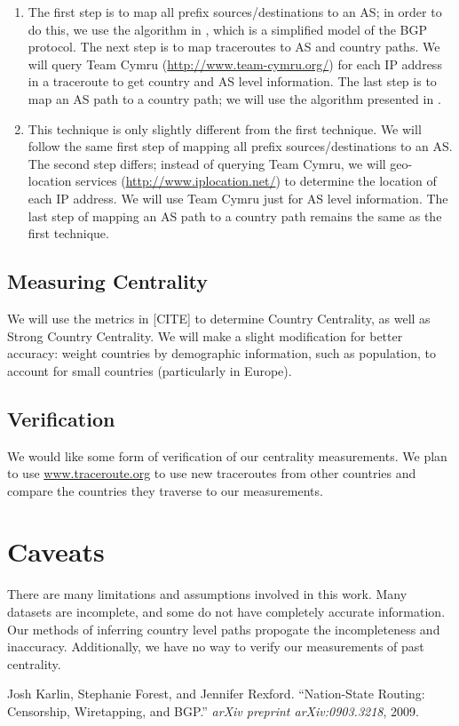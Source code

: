 \documentclass[12pt, letterpaper]{article}
\begin{document}
\begin{spacing}{.95}
\begin{enumerate} [noitemsep]

\item The first step is to map all prefix sources/destinations to an AS; in order to do this, we use the algorithm in \cite{nationstate}, which is a simplified model of the BGP protocol.  The next step is to map traceroutes to AS and country paths.  We will query Team Cymru (\url{http://www.team-cymru.org/}) for each IP address in a traceroute to get country and AS level information.  The last step is to map an AS path to a country path; we will use the algorithm presented in \cite{nationstate}.
\item This technique is only slightly different from the first technique.  We will follow the same first step of mapping all prefix sources/destinations to an AS.  The second step differs; instead of querying Team Cymru, we will geo-location services (\url{http://www.iplocation.net/}) to determine the location of each IP address.  We will use Team Cymru just for AS level information.  The last step of mapping an AS path to a country path remains the same as the first technique.

\end{enumerate}

\subsection{Measuring Centrality}

We will use the metrics in [CITE] to determine Country Centrality, as well as Strong Country Centrality.  We will make a slight modification for better accuracy: weight countries by demographic information, such as population, to account for small countries (particularly in Europe).   

\subsection{Verification}

We would like some form of verification of our centrality measurements.  We plan to use \url{www.traceroute.org} to use new traceroutes from other countries and compare the countries they traverse to our measurements.  

\section{Caveats}

There are many limitations and assumptions involved in this work.  Many datasets are incomplete, and some do not have completely accurate information.  Our methods of inferring country level paths propogate the incompleteness and inaccuracy.  Additionally, we have no way to verify our measurements of past centrality.  

\end{spacing}

\begin{thebibliography}{99}

 Josh Karlin, Stephanie Forest, and Jennifer Rexford. ``Nation-State Routing: Censorship, Wiretapping, and BGP.'' \emph{arXiv preprint arXiv:0903.3218}, 2009.

\end{thebibliography}
\end{document}
